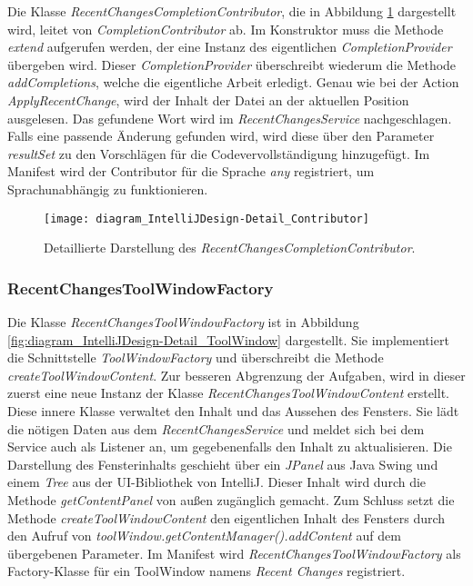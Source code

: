 Die Klasse \emph{RecentChangesCompletionContributor}, die in Abbildung
\ref{fig:diagram_IntelliJDesign-Detail_Contributor} dargestellt wird,
leitet von \emph{CompletionContributor} ab. Im Konstruktor muss
die Methode \emph{extend} aufgerufen werden, der eine Instanz 
des eigentlichen \emph{CompletionProvider} übergeben wird.
Dieser \emph{CompletionProvider} überschreibt wiederum die 
Methode \emph{addCompletions}, welche die eigentliche Arbeit erledigt.
Genau wie bei der Action \emph{ApplyRecentChange}, wird der
Inhalt der Datei an der aktuellen Position ausgelesen. Das gefundene
Wort wird im \emph{RecentChangesService} nachgeschlagen.
Falls eine passende Änderung gefunden wird, wird diese über den 
Parameter \emph{resultSet} zu den Vorschlägen für die Codevervollständigung
hinzugefügt.
Im Manifest wird der Contributor für die Sprache \emph{any} registriert,
um Sprachunabhängig zu funktionieren.

\begin{figure}
    \centering
    \texttt{[image: diagram\_IntelliJDesign-Detail\_Contributor]}
    \caption{Detaillierte Darstellung des \emph{RecentChangesCompletionContributor}.}
    \label{fig:diagram_IntelliJDesign-Detail_Contributor}
\end{figure}

\subsubsection{RecentChangesToolWindowFactory}

Die Klasse \emph{RecentChangesToolWindowFactory} ist in Abbildung
\ref{fig:diagram_IntelliJDesign-Detail_ToolWindow} dargestellt.
Sie implementiert die Schnittstelle \emph{ToolWindowFactory} 
und überschreibt die Methode \emph{createToolWindowContent}. Zur besseren 
Abgrenzung der Aufgaben, wird in dieser zuerst eine neue Instanz
der Klasse \emph{RecentChangesToolWindowContent} erstellt.
Diese innere Klasse verwaltet den Inhalt und das Aussehen des Fensters.
Sie lädt die nötigen Daten aus dem \emph{RecentChangesService} und
meldet sich bei dem Service auch als Listener an, um gegebenenfalls den
Inhalt zu aktualisieren. Die Darstellung des Fensterinhalts
geschieht über ein \emph{JPanel} aus Java Swing und einem \emph{Tree}
aus der UI-Bibliothek von IntelliJ. Dieser Inhalt wird
durch die Methode \emph{getContentPanel} von außen zugänglich gemacht.
Zum Schluss setzt die Methode \emph{createToolWindowContent} 
den eigentlichen Inhalt des Fensters durch den Aufruf von
\emph{toolWindow.getContentManager().addContent} auf dem übergebenen
Parameter.
Im Manifest wird \emph{RecentChangesToolWindowFactory} als Factory-Klasse
für ein ToolWindow namens \emph{Recent Changes} registriert.

